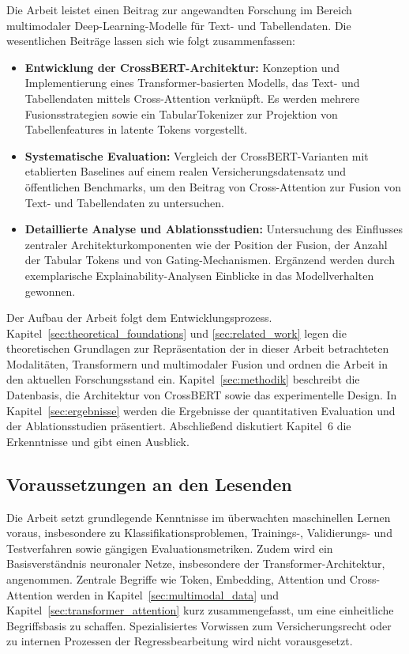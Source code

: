 Die Arbeit leistet einen Beitrag zur angewandten Forschung im Bereich multimodaler Deep-Learning-Modelle für Text- und Tabellendaten. Die wesentlichen Beiträge lassen sich wie folgt zusammenfassen:
\begin{itemize}
    \item \textbf{Entwicklung der CrossBERT-Architektur:} Konzeption und Implementierung eines Transformer-basierten Modells, das Text- und Tabellendaten mittels Cross-Attention verknüpft. Es werden mehrere Fusionsstrategien sowie ein TabularTokenizer zur Projektion von Tabellenfeatures in latente Tokens vorgestellt.
    \item \textbf{Systematische Evaluation:} Vergleich der CrossBERT-Varianten mit etablierten Baselines auf einem realen Versicherungsdatensatz und öffentlichen Benchmarks, um den Beitrag von Cross-Attention zur Fusion von Text- und Tabellendaten zu untersuchen.
    \item \textbf{Detaillierte Analyse und Ablationsstudien:} Untersuchung des Einflusses zentraler Architekturkomponenten wie der Position der Fusion, der Anzahl der Tabular Tokens und von Gating-Mechanismen. Ergänzend werden durch exemplarische Explainability-Analysen Einblicke in das Modellverhalten gewonnen.
\end{itemize}

Der Aufbau der Arbeit folgt dem Entwicklungsprozess. Kapitel~\ref{sec:theoretical_foundations} und \ref{sec:related_work} legen die theoretischen Grundlagen zur Repräsentation der in dieser Arbeit betrachteten Modalitäten, Transformern und multimodaler Fusion und ordnen die Arbeit in den aktuellen Forschungsstand ein. Kapitel~\ref{sec:methodik} beschreibt die Datenbasis, die Architektur von CrossBERT sowie das experimentelle Design. In Kapitel~\ref{sec:ergebnisse} werden die Ergebnisse der quantitativen Evaluation und der Ablationsstudien präsentiert. Abschließend diskutiert Kapitel~6 die Erkenntnisse und gibt einen Ausblick.


\subsection{Voraussetzungen an den Lesenden}
 
 Die Arbeit setzt grundlegende Kenntnisse im überwachten maschinellen Lernen voraus, insbesondere zu Klassifikationsproblemen, Trainings-, Validierungs- und Testverfahren sowie gängigen Evaluationsmetriken. Zudem wird ein Basisverständnis neuronaler Netze, insbesondere der Transformer-Architektur, angenommen. Zentrale Begriffe wie Token, Embedding, Attention und Cross-Attention werden in Kapitel~\ref{sec:multimodal_data} und Kapitel~\ref{sec:transformer_attention} kurz zusammengefasst, um eine einheitliche Begriffsbasis zu schaffen. Spezialisiertes Vorwissen zum Versicherungsrecht oder zu internen Prozessen der Regressbearbeitung wird nicht vorausgesetzt.
